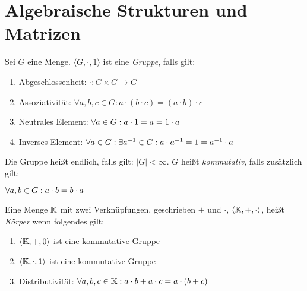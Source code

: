 \section{Algebraische Strukturen und Matrizen}

\begin{definition}[Gruppe]
	Sei $G$ eine Menge. $\langle G, \cdot, 1 \rangle$ ist eine \emph{Gruppe}, falls gilt:
	\begin{enumerate}[noitemsep]
		\item Abgeschlossenheit: $\cdot : G \times G \rightarrow G$
		\item Assoziativität: $\forall a,b,c \in G : a \cdot (b \cdot c) = (a \cdot b) \cdot c$
		\item Neutrales Element: $\forall a \in G: a \cdot 1 = a = 1 \cdot a$
		\item Inverses Element: $\forall a \in G: \exists a^{-1} \in G: a \cdot a^{-1} = 1 = a^{-1} \cdot a$
	\end{enumerate}

	Die Gruppe heißt endlich, falls gilt: $|G| < \infty$. $G$ heißt \emph{kommutativ}, falls zusätzlich gilt:
	\begin{description}
		\item $\forall a,b \in G: a \cdot b = b \cdot a$
	\end{description}
\end{definition}

\begin{definition}[Körper]
	Eine Menge $\mathbb{K}$ mit zwei Verknüpfungen, geschrieben $+$ und $\cdot$, $\langle \mathbb{K},+,\cdot \rangle$, heißt \emph{Körper} wenn folgendes gilt:
	
	\begin{enumerate}[noitemsep]
		\item $\langle \mathbb{K}, +, 0 \rangle$ ist eine kommutative Gruppe
		\item $\langle \mathbb{K}, \cdot, 1 \rangle$ ist eine kommutative Gruppe
		\item Distributivität: $\forall a,b,c \in \mathbb{K}: a \cdot b + a \cdot c = a \cdot (b +c)$
	\end{enumerate}
\end{definition}

